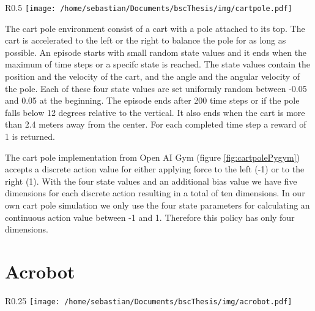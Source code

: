 \begin{wrapfigure}{R}{0.5\textwidth}
    \centering
    \texttt{[image: /home/sebastian/Documents/bscThesis/img/cartpole.pdf]}
    \caption{Visualization of the cart pole rendered by the Open AI Gym\label{fig:cartpolePygym}}
\end{wrapfigure}

The cart pole environment consist of a cart with a pole attached to its top. The cart is accelerated to the left or the right to balance the pole for as long as possible. An episode starts with small random state values and it ends when the maximum of time steps or a specifc state is reached. The state values contain the position and the velocity of the cart, and the angle and the angular velocity of the pole. Each of these four state values are set uniformly random between -0.05 and 0.05 at the beginning. The episode ends after 200 time steps or if the pole falls below 12 degrees relative to the vertical. It also ends when the cart is more than 2.4 meters away from the center. For each completed time step a reward of 1 is returned.


The cart pole implementation from Open AI Gym (figure \ref{fig:cartpolePygym}) accepts a discrete action value for either applying force to the left (-1) or to the right (1). With the four state values and an additional bias value we have five dimensions for each discrete action resulting in a total of ten dimensions. In our own cart pole simulation we only use the four state parameters for calculating an continuous action value between -1 and 1. Therefore this policy has only four dimensions.


\section{Acrobot}

\begin{wrapfigure}{R}{0.25\textwidth}
    \centering
    \texttt{[image: /home/sebastian/Documents/bscThesis/img/acrobot.pdf]}
    \caption{Visualization of the Acrobot rendered by the Open AI Gym\label{fig:acrobotPygym}}
\end{wrapfigure}


